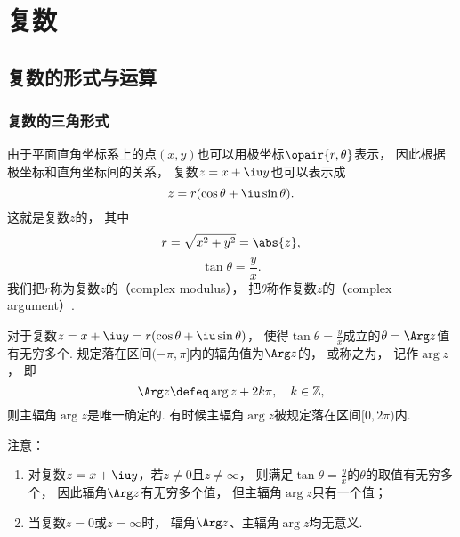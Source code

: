 \chapter{复数}
\section{复数的形式与运算}
\subsection{复数的三角形式}
\begin{definition}%
由于平面直角坐标系上的点\((x,y)\)也可以用极坐标\(\opair{r,\theta}\)表示，
因此根据极坐标和直角坐标间的关系，
复数\(z = x + \iu y\)也可以表示成\begin{equation*}
	z = r(\cos\theta+ \iu \sin\theta).
\end{equation*}
这就是复数\(z\)的，
其中\begin{equation*}
	r = \sqrt{x^2+y^2} = \abs{z},
\end{equation*}\begin{equation*}
	\tan\theta = \frac{y}{x}.
\end{equation*}
我们把\(r\)称为复数\(z\)的（complex modulus），
把\(\theta\)称作复数\(z\)的（complex argument）.
\end{definition}

对于复数\(z = x + \iu y=r(\cos\theta+ \iu \sin\theta)\)，
使得\(\tan\theta=\frac{y}{x}\)成立的\(\theta=\Arg z\)值有无穷多个.
规定落在区间\((-\pi,\pi]\)内的辐角值为\(\Arg z\)的，
或称之为，
记作\(\arg{z}\)，
即\begin{equation*}
	\Arg z \defeq \arg{z} + 2k\pi, \quad k\in\mathbb{Z},
\end{equation*}
则主辐角\(\arg{z}\)是唯一确定的.
有时候主辐角\(\arg{z}\)被规定落在区间\([0,2\pi)\)内.

注意：\begin{enumerate}
	\item 对复数\(z = x + \iu y\)，若\(z \neq 0\)且\(z \neq \infty\)，
	则满足\(\tan \theta = \frac{y}{x}\)的\(\theta\)的取值有无穷多个，
	因此辐角\(\Arg z\)有无穷多个值，
	但主辐角\(\arg z\)只有一个值；
	\item 当复数\(z = 0\)或\(z = \infty\)时，
	辐角\(\Arg z\)、主辐角\(\arg{z}\)均无意义.
\end{enumerate}

